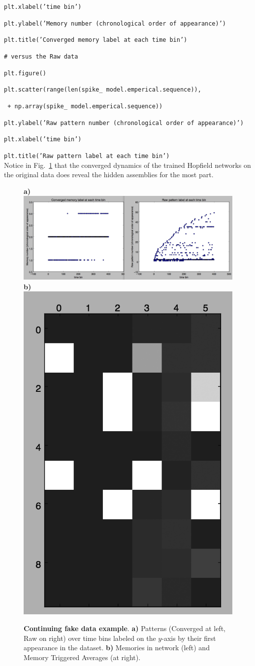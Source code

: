 \documentclass[letter, 12pt]{article}
\theoremstyle{definition}
\theoremstyle{remark}
\begin{document}
\texttt{plt.xlabel('time bin')}

\texttt{plt.ylabel('Memory number (chronological order of appearance)')}

\texttt{plt.title('Converged memory label at each time bin')}

\texttt{\# versus the Raw data}

\texttt{plt.figure()}

\texttt{plt.scatter(range(len(spike\_\,model.emperical.sequence)),}

\texttt{\quad \quad {} + np.array(spike\_\,model.emperical.sequence))}

\texttt{plt.ylabel('Raw pattern number (chronological order of appearance)')}

\texttt{plt.xlabel('time bin')}

\texttt{plt.title('Raw pattern label at each time bin')}  \\
 
Notice in Fig.~\ref{fake_ex_fig2} that the converged dynamics of the trained Hopfield networks on the original data does reveal the 
hidden assemblies for the most part.

\begin{figure}[t!]
\begin{center}
\textbf{a)}\includegraphics[width=.75\linewidth]{chron_order_patterns.png} 
\textbf{b)}\includegraphics[width=.19\linewidth]{memories_stas.png} 
\caption{\textbf{Continuing fake data example}. \textbf{a)} Patterns (Converged at left, Raw on right) over time bins labeled on the $y$-axis by their first appearance in the dataset.  \textbf{b)}  Memories in network (left) and Memory Triggered Averages (at right).}
\label{fake_ex_fig2}
\vspace{-.8cm}
\end{center}
\end{figure}
\end{document}
